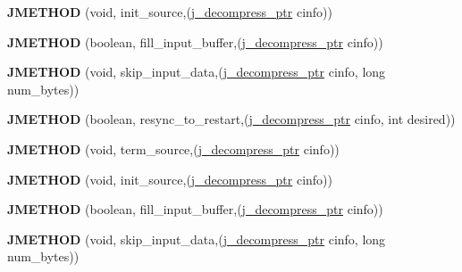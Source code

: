 \begin{DoxyCompactItemize}
{\bfseries J\+M\+E\+T\+H\+OD} (void, init\+\_\+source,(\hyperlink{structjpeg__decompress__struct}{j\+\_\+decompress\+\_\+ptr} cinfo))
\item 
\mbox{\label{structjpeg__source__mgr_ab4a579b1f50108e2de73c7c0c1bbb9fd}} 
{\bfseries J\+M\+E\+T\+H\+OD} (boolean, fill\+\_\+input\+\_\+buffer,(\hyperlink{structjpeg__decompress__struct}{j\+\_\+decompress\+\_\+ptr} cinfo))
\item 
\mbox{\label{structjpeg__source__mgr_a3e29df8ddadb0c15e54b69b5a7a10305}} 
{\bfseries J\+M\+E\+T\+H\+OD} (void, skip\+\_\+input\+\_\+data,(\hyperlink{structjpeg__decompress__struct}{j\+\_\+decompress\+\_\+ptr} cinfo, long num\+\_\+bytes))
\item 
\mbox{\label{structjpeg__source__mgr_a60a35ccd1fb8d954f34c0cdbf29ac010}} 
{\bfseries J\+M\+E\+T\+H\+OD} (boolean, resync\+\_\+to\+\_\+restart,(\hyperlink{structjpeg__decompress__struct}{j\+\_\+decompress\+\_\+ptr} cinfo, int desired))
\item 
\mbox{\label{structjpeg__source__mgr_a6c0683ce1166b9ee659b2d3aa1efb1c2}} 
{\bfseries J\+M\+E\+T\+H\+OD} (void, term\+\_\+source,(\hyperlink{structjpeg__decompress__struct}{j\+\_\+decompress\+\_\+ptr} cinfo))
\item 
\mbox{\label{structjpeg__source__mgr_af8fda02c19c9dc4e505daabb77c3ad81}} 
{\bfseries J\+M\+E\+T\+H\+OD} (void, init\+\_\+source,(\hyperlink{structjpeg__decompress__struct}{j\+\_\+decompress\+\_\+ptr} cinfo))
\item 
\mbox{\label{structjpeg__source__mgr_ab4a579b1f50108e2de73c7c0c1bbb9fd}} 
{\bfseries J\+M\+E\+T\+H\+OD} (boolean, fill\+\_\+input\+\_\+buffer,(\hyperlink{structjpeg__decompress__struct}{j\+\_\+decompress\+\_\+ptr} cinfo))
\item 
\mbox{\label{structjpeg__source__mgr_a3e29df8ddadb0c15e54b69b5a7a10305}} 
{\bfseries J\+M\+E\+T\+H\+OD} (void, skip\+\_\+input\+\_\+data,(\hyperlink{structjpeg__decompress__struct}{j\+\_\+decompress\+\_\+ptr} cinfo, long num\+\_\+bytes))
\item 
\mbox{\label{structjpeg__source__mgr_a60a35ccd1fb8d954f34c0cdbf29ac010}} 

\end{DoxyCompactItemize}
